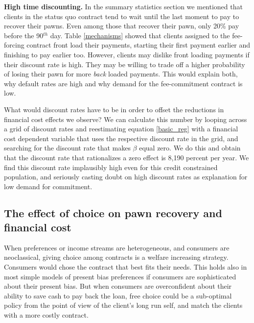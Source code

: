\documentclass[11pt]{article}
\begin{document}
\vspace{.1in}
\noindent \textbf{High time discounting.} In the summary statistics section we mentioned that clients in the status quo contract tend to wait until the last moment to pay to recover their pawns. Even among those that recover their pawn, only 20\% pay before the 90$^{th}$ day. Table \ref{mechanisms} showed that clients assigned to the fee-forcing contract front load their payments, starting their first payment earlier and finishing to pay earlier too. However, clients may dislike front loading payments if their discount rate is high. They may be willing to trade off a higher probability of losing their pawn for more \textit{back} loaded payments. This would explain both, why default rates are high and why demand for the fee-commitment contract is low. 

What would discount rates have to be in order to offset the reductions in financial cost effects we observe? We can calculate this number by looping across a grid of discount rates and reestimating equation \ref{basic_reg} with a financial cost dependent variable that uses the respective discount rate in the grid, and searching for the discount rate that makes $\beta$ equal zero. We do this and obtain that the discount rate that rationalizes a zero effect is 8,190 percent per year. We find this discount rate implausibly high even for this credit constrained population, and seriously casting doubt on high discount rates as explanation for low demand for commitment.%





\subsection{The effect of choice on pawn recovery and financial cost} \label{effect_choice}

When preferences or income streams are heterogeneous, and consumers are neoclassical, giving choice among contracts is a welfare increasing strategy. Consumers would chose the contract that best fits their needs. This holds also in most simple models of present bias preferences if consumers are sophisticated about their present bias. %
But when consumers are overconfident about their ability to save cash to pay back the loan, free choice could be a sub-optimal policy from the point of view of the client's long run self, and match the clients with a more costly contract. 
\end{document}
